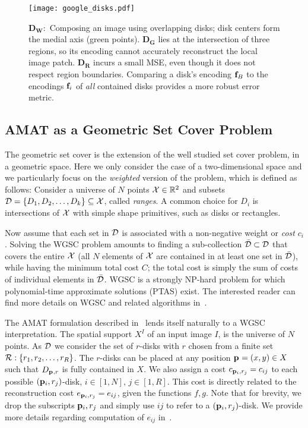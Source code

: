 \documentclass[10pt,twocolumn,letterpaper]{article}
\begin{document}
\begin{figure}[t]
\centering
\texttt{[image: google\_disks.pdf]}
\caption{$\mathbf{D_W:}$ Composing an image using overlapping disks; disk centers form the medial axis (green points).
$\mathbf{D_G}$ lies at the intersection of three regions, so its encoding cannot accurately reconstruct the local image patch.
$\mathbf{D_R}$ incurs a small MSE, even though it does not respect region boundaries.
Comparing a disk's encoding $\mathbf{f}_{B}$ to the encodings $\mathbf{f}_{i}$ of \emph{all} contained disks provides a more robust
error metric.}
\label{fig:google}
\end{figure}

\subsection{AMAT as a Geometric Set Cover Problem}\label{sec:method:wgsc}
The geometric set cover is the extension of the well studied set cover problem, in a geometric space.
Here we only consider the case of a two-dimensional space and we particularly focus on the 
\emph{weighted} version of the problem, which is defined as follows:
Consider a universe of $N$ points $\mathcal{X} \in \mathbb{R}^2$ and subsets
$\mathcal{D} = \{D_1,D_2,\ldots,D_k\} \subseteq \mathcal{X}$, called \emph{ranges}. 
A common choice for $D_i$ is intersections of $\mathcal{X}$ with simple shape primitives, such as disks or rectangles.

Now assume that each set in $\mathcal{D}$ is associated with a non-negative weight or \emph{cost} $c_i$.
Solving the WGSC problem amounts to finding a sub-collection $\bar{\mathcal{D}} \subset \mathcal{D}$ that covers the entire $\mathcal{X}$
(all $N$ elements of $\mathcal{X}$ are contained in at least one set in $\bar{\mathcal{D}}$), while having the minimum
total cost $C$; the total cost is simply the sum of costs of individual elements in $\bar{\mathcal{D}}$.
WGSC is a strongly NP-hard problem for which polynomial-time approximate solutions (PTAS) exist.
The interested reader can find more details on WGSC and related algorithms 
in~\cite{mustafa2015quasi,varadarajan2010weighted,har2012weighted,chan2012weighted}.

The AMAT formulation described in~ lends itself naturally to a 
WGSC interpretation.
The spatial support $X^I$ of an input image $I$, is the universe of $N$ points.
As $\mathcal{D}$ we consider the set of $r$-disks with $r$ chosen from a finite set $\mathcal{R}:\{r_1,r_2,\ldots,r_R\}$.
The $r$-disks can be placed at any position $\mathbf{p}_{}=(x,y)\in X$ such that $D_{\mathbf{p}_{},r}$ is fully contained in $X$.
We also assign a cost $c_{\mathbf{p}_{i},r_j} = c_{ij}$ to each possible $(\mathbf{p}_{i},r_j)$-disk, $i\in[1,N],\, j\in[1,R]$.
This cost is directly related to the reconstruction cost 
$e_{\mathbf{p}_{i},r_j} = e_{ij}$, given the functions $f,g$.
Note that for brevity, we drop the subscripts $\mathbf{p}_{i},r_j$ and simply use $ij$ to refer to a $(\mathbf{p}_{i},r_j)$-disk.
We provide more details regarding computation of $e_{ij}$ in~.
\end{document}

